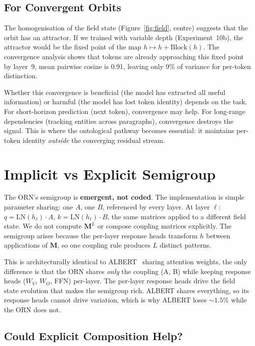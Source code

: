 \documentclass[11pt, a4paper]{article}
\newcommand{\M}{\mathbf{M}}
\theoremstyle{plain}
\theoremstyle{remark}
\begin{document}
\subsection{For Convergent Orbits}

The homogenisation of the field state (Figure~\ref{fig:field}, centre) suggests that the orbit has an attractor.
If we trained with variable depth (Experiment~10b), the attractor would be the fixed point of the map $h \mapsto h + \text{Block}(h)$.
The convergence analysis shows that tokens are already approaching this fixed point by layer~9, mean pairwise cosine is 0.91, leaving only 9\% of variance for per-token distinction.

Whether this convergence is beneficial (the model has extracted all useful information) or harmful (the model has lost token identity) depends on the task.
For short-horizon prediction (next token), convergence may help.
For long-range dependencies (tracking entities across paragraphs), convergence destroys the signal.
This is where the ontological pathway becomes essential: it maintains per-token identity \emph{outside} the converging residual stream.

\section{Implicit vs Explicit Semigroup}

The ORN's semigroup is \textbf{emergent, not coded}.
The implementation is simple parameter sharing: one $A$, one $B$, referenced by every layer.
At layer $\ell$: $q = \text{LN}(h_\ell) \cdot A$, $k = \text{LN}(h_\ell) \cdot B$, the same matrices applied to a different field state.
We do not compute $\M^L$ or compose coupling matrices explicitly.
The semigroup arises because the per-layer response heads transform $h$ between applications of $\M$, so one coupling rule produces $L$ distinct patterns.

This is architecturally identical to ALBERT~\cite{lan2020albert} sharing attention weights, the only difference is that the ORN shares \emph{only} the coupling (A, B) while keeping response heads ($W_V$, $W_O$, FFN) per-layer.
The per-layer response heads drive the field state evolution that makes the semigroup rich.
ALBERT shares everything, so its response heads cannot drive variation, which is why ALBERT loses ${\sim}1.5\%$ while the ORN does not.

\subsection{Could Explicit Composition Help?}
\end{document}
